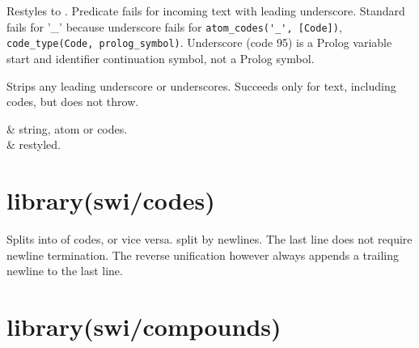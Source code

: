 \begin{description}
Restyles  to . Predicate  fails for
incoming text with leading underscore. Standard
 fails for '_' because underscore fails for
\verb$atom_codes('_', [Code])$, \verb$code_type(Code, prolog_symbol)$. Underscore
(code 95) is a Prolog variable start and identifier continuation
symbol, not a Prolog symbol.

Strips any leading underscore or underscores. Succeeds only for
text, including codes, but does not throw.

\begin{arguments}
 & string, atom or codes. \\
 & restyled. \\
\end{arguments}
\end{description}

\chapter{library(swi/codes)}\label{sec:codes}

\begin{description}
Splits  into  of codes, or vice versa.  split by
newlines. The last line does not require newline termination. The
reverse unification however always appends a trailing newline to the
last line.
\end{description}

\chapter{library(swi/compounds)}\label{sec:compounds}

